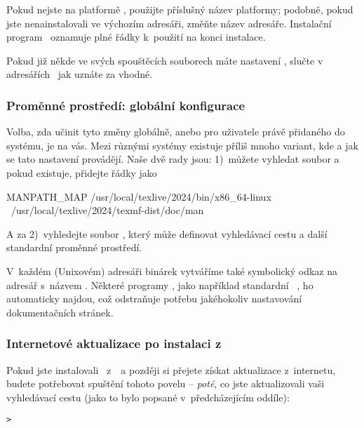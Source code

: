 \documentclass[\classoptions,slovak,english,czech]{\classname}
\begin{document}
Pokud nejste na platformě , použijte příslušný
název platformy; podobně, pokud jste nenainstalovali ve výchozím
adresáři, změňte název adresáře. Instalační program \TL\ oznamuje
plné řádky k~použití na konci instalace.

Pokud již někde ve svých spouštěcích souborech máte nastavení , 
slučte v adresářích \TL\, jak uznáte za vhodné. 


\subsubsection{Proměnné prostředí: globální konfigurace}
\label{sec:envglobal}
Volba, zda učinit tyto změny globálně, anebo pro uživatele právě
přidaného do systému, je na vás. Mezi různými systémy existuje 
příliš mnoho variant, kde a jak se tato nastavení provádějí.
Naše dvě rady jsou: 1)~můžete vyhledat soubor
 a pokud existuje, přidejte řádky jako

\begin{sverbatim}
MANPATH_MAP /usr/local/texlive/2024/bin/x86_64-linux \
            /usr/local/texlive/2024/texmf-dist/doc/man
\end{sverbatim}

A za 2)~vyhledejte soubor ,
který může definovat vyhledávací cestu a další standardní 
proměnné prostředí.

V~každém (Unixovém) adresáři binárek vytváříme také symbolický 
odkaz na adresář  s~názvem .
Některé programy , jako například standardní
\macOS\ \code{man}, ho automaticky najdou, což odstraňuje
potřebu jakéhokoliv nastavování dokumentačních stránek.

\subsubsection{Internetové aktualizace po instalaci z~\protect\DVD}
\label{sec:dvd-install-net-updates}

Pokud jste instalovali \TL\ z~\DVD\ a později si přejete
získat aktualizace z~internetu, budete potřebovat spuštění
tohoto povelu -- \emph{poté}, co jste aktualizovali vaši
vyhledávací cestu (jako to bylo popsané v~předcházejícím oddíle):

\begin{alltt}
> 
\end{alltt}
\end{document}
